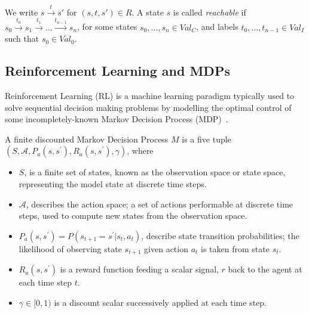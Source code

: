 \documentclass[runningheads]{llncs}
\begin{document}
We write $ s \xrightarrow{t} s'$ for $(s,t,s')\in R$.
A state $s$ is called \emph{reachable} if 
$s_0 \xrightarrow{t_0} s_{1} \xrightarrow{t_1} \ldots 
\xrightarrow{t_{n-1}} s_n$,  
for some states $s_0,\ldots, s_{n} \in Val_C$, and 
labels $t_0, \ldots, t_{n-1} \in Val_I$ such that
$s_0 \in Val_0$.  


\subsection{Reinforcement Learning and MDPs} 
Reinforcement Learning (RL) is a machine learning paradigm typically used to  solve sequential decision making problems by modelling the optimal control of some incompletely-known Markov Decision Process (MDP)~\cite{sutton2018reinforcement}. 
\begin{definition}
	A finite discounted Markov Decision Process $M$ is a five tuple $(S,\mathcal{A},P_a(s,s^\prime), R_a(s,s^\prime),\gamma)$, where
\end{definition} 
\begin{itemize}
	\item $S$, is a finite set of states, known as the observation space or state space, representing the model state at discrete time steps.
	\item $\mathcal{A}$, describes the action space; a set of actions performable at discrete time steps, used to compute new states from the observation space.
	\item $P_a(s,s^\prime) = P(s_{t+1} = s^\prime | s_t, a_t)$, describe state transition probabilities; the likelihood of observing state $s_{t+1}$ given action $a_t$ is taken from state $s_t$.
	\item $R_a(s,s^\prime)$ is a reward function feeding a scalar signal, $r$ back to the agent at each time step $t$. 
	\item $\gamma \in [0,1)$ is a discount scalar successively applied at each time step.
\end{itemize}
\end{document}
